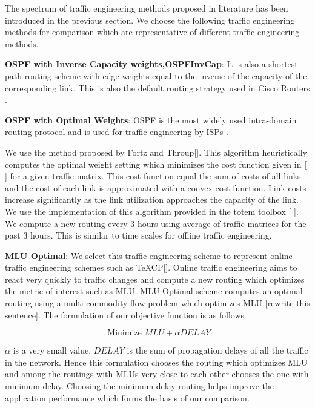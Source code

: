 
The spectrum of traffic engineering methods proposed in literature has been introduced in the previous section. 
We choose the following traffic engineering methods for comparison which are representative of different traffic engineering methods.

\textbf{OSPF with Inverse Capacity weights,OSPFInvCap}:  It is also a shortest path routing scheme with edge weights equal to the inverse of the capacity of the corresponding link. This is also the default routing strategy used in Cisco Routers \cite{InvCap}.

 \textbf{OSPF with Optimal Weights}:
OSPF is the most widely used intra-domain routing protocol and is used for traffic engineering by ISPs \cite{FortzThorup2,rexford}. 

We use the method proposed by Fortz and Throup[\cite{FortzThorup}]. This algorithm heuristically computes the optimal weight setting which minimizes the cost function given in [ \cite{FortzThorup} ] for a given traffic matrix. This cost function equal the sum of costs of all links and the  cost of each link is approximated with a convex cost function. Link costs increase significantly as the link utilization approaches the capacity of the link. We use the implementation of this algorithm provided in the totem toolbox [ \cite{TotemData} ]. We compute a new routing every 3 hours using average of traffic matrices for the past 3 hours. This is similar to time scales for offline traffic engineering.

 \textbf{MLU Optimal}:
We select this traffic engineering scheme to represent online traffic engineering schemes such as TeXCP[\cite{TeXCP}]. 
Online traffic engineering aims to react very quickly to traffic changes and compute a new routing which optimizes the metric of interest such as MLU. MLU Optimal scheme computes an optimal routing using a multi-commodity flow problem which optimizes MLU [rewrite this sentence]. The formulation of our objective function is as follows

\[ \mbox{ Minimize } MLU + \alpha DELAY\]

$\alpha$ is a very small value. $DELAY$ is the sum of propagation delays of all the traffic in the network. Hence this formulation chooses the routing which optimizes MLU and among the routings with MLUs very close to each other chooses the one with minimum delay. Choosing the minimum delay routing helps improve the application performance which forms the basis of our comparison.


